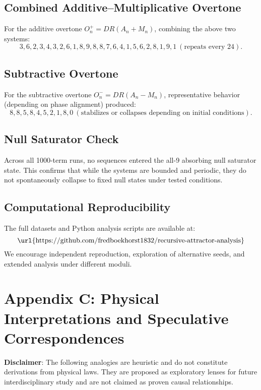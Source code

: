 \documentclass[12pt]{article}
\begin{document}
\subsection{Combined Additive--Multiplicative Overtone}

For the additive overtone \( O_n^+ = DR(A_n + M_n) \), combining the above two systems:
\[
3, 6, 2, 3, 4, 3, 2, 6, 1, 8, 9, 8, 8, 7, 6, 4, 1, 5, 6, 2, 8, 1, 9, 1 \ (\text{repeats every 24}).
\]

\subsection{Subtractive Overtone}

For the subtractive overtone \( O_n^- = DR(A_n - M_n) \), representative behavior (depending on phase alignment) produced:
\[
8, 8, 5, 8, 4, 5, 2, 1, 8, 0 \ (\text{stabilizes or collapses depending on initial conditions}).
\]

\subsection{Null Saturator Check}

Across all 1000-term runs, no sequences entered the all-9 absorbing null saturator state.  
This confirms that while the systems are bounded and periodic, they do not spontaneously collapse to fixed null states under tested conditions.

\subsection{Computational Reproducibility}

The full datasets and Python analysis scripts are available at:
\[
\text{\url{https://github.com/fredboekhorst1832/recursive-attractor-analysis}}
\]
We encourage independent reproduction, exploration of alternative seeds, and extended analysis under different moduli.

\section{Appendix C: Physical Interpretations and Speculative Correspondences}

\textbf{Disclaimer}: The following analogies are heuristic and do not constitute derivations from physical laws. They are proposed as exploratory lenses for future interdisciplinary study and are not claimed as proven causal relationships.
\end{document}
